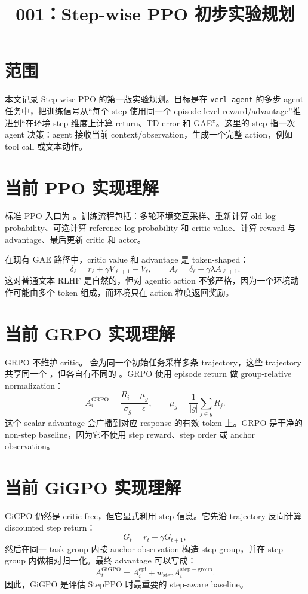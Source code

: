 \documentclass[10pt]{ctexart}
\title{001：Step-wise PPO 初步实验规划}
\author{}
\date{}
\begin{document}
\maketitle
\vspace{-1.2em}

\section*{范围}
本文记录 Step-wise PPO 的第一版实验规划。目标是在 \texttt{verl-agent} 的多步 agent 任务中，把训练信号从“每个 step 使用同一个 episode-level reward/advantage”推进到“在环境 step 维度上计算 return、TD error 和 GAE”。这里的 step 指一次 agent 决策：agent 接收当前 context/observation，生成一个完整 action，例如 tool call 或文本动作。

\section*{当前 PPO 实现理解}
标准 PPO 入口为 。训练流程包括：多轮环境交互采样、重新计算 old log probability、可选计算 reference log probability 和 critic value、计算 reward 与 advantage、最后更新 critic 和 actor。

在现有 GAE 路径中，critic value 和 advantage 是 token-shaped：
\[
\delta_\ell = r_\ell + \gamma V_{\ell+1} - V_\ell,
\qquad
A_\ell = \delta_\ell + \gamma\lambda A_{\ell+1}.
\]
这对普通文本 RLHF 是自然的，但对 agentic action 不够严格，因为一个环境动作可能由多个 token 组成，而环境只在 action 粒度返回奖励。

\section*{当前 GRPO 实现理解}
GRPO 不维护 critic。 会为同一个初始任务采样多条 trajectory，这些 trajectory 共享同一个 ，但各自有不同的 。GRPO 使用 episode return 做 group-relative normalization：
\[
A_i^{\mathrm{GRPO}}
= \frac{R_i - \mu_g}{\sigma_g + \epsilon},
\qquad
\mu_g = \frac{1}{|g|}\sum_{j\in g} R_j.
\]
这个 scalar advantage 会广播到对应 response 的有效 token 上。GRPO 是干净的 non-step baseline，因为它不使用 step reward、step order 或 anchor observation。

\section*{当前 GiGPO 实现理解}
GiGPO 仍然是 critic-free，但它显式利用 step 信息。它先沿 trajectory 反向计算 discounted step return：
\[
G_t = r_t + \gamma G_{t+1},
\]
然后在同一 task group 内按 anchor observation 构造 step group，并在 step group 内做相对归一化。最终 advantage 可以写成：
\[
A_t^{\mathrm{GiGPO}}
= A_i^{\mathrm{epi}} + w_{\mathrm{step}} A_t^{\mathrm{step-group}}.
\]
因此，GiGPO 是评估 StepPPO 时最重要的 step-aware baseline。
\end{document}
